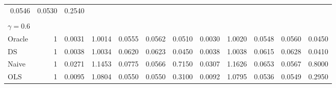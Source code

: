 \begin{tabular}{llllllllllll}
  \multicolumn{1}{r}{0.0546} &
  \multicolumn{1}{r}{0.0530} &
  \multicolumn{1}{r}{0.2540} \\
\multicolumn{1}{l}{} &
  \multicolumn{1}{|r}{} &
  \multicolumn{1}{r}{} &
  \multicolumn{1}{r}{} &
  \multicolumn{1}{r}{} &
  \multicolumn{1}{r}{} &
  \multicolumn{1}{r}{} &
  \multicolumn{1}{r}{} &
  \multicolumn{1}{r}{} &
  \multicolumn{1}{r}{} &
  \multicolumn{1}{r}{} &
  \multicolumn{1}{r}{} \\
\multicolumn{1}{l}{$\gamma = 0.6$} &
  \multicolumn{1}{|r}{} &
  \multicolumn{1}{r}{} &
  \multicolumn{1}{r}{} &
  \multicolumn{1}{r}{} &
  \multicolumn{1}{r}{} &
  \multicolumn{1}{r}{} &
  \multicolumn{1}{r}{} &
  \multicolumn{1}{r}{} &
  \multicolumn{1}{r}{} &
  \multicolumn{1}{r}{} &
  \multicolumn{1}{r}{} \\
\multicolumn{1}{l}{\hspace{1em}Oracle} &
  \multicolumn{1}{|r}{1} &
  \multicolumn{1}{r}{0.0031} &
  \multicolumn{1}{r}{1.0014} &
  \multicolumn{1}{r}{0.0555} &
  \multicolumn{1}{r}{0.0562} &
  \multicolumn{1}{r}{0.0510} &
  \multicolumn{1}{r}{0.0030} &
  \multicolumn{1}{r}{1.0020} &
  \multicolumn{1}{r}{0.0548} &
  \multicolumn{1}{r}{0.0560} &
  \multicolumn{1}{r}{0.0450} \\
\multicolumn{1}{l}{\hspace{1em}DS} &
  \multicolumn{1}{|r}{1} &
  \multicolumn{1}{r}{0.0038} &
  \multicolumn{1}{r}{1.0034} &
  \multicolumn{1}{r}{0.0620} &
  \multicolumn{1}{r}{0.0623} &
  \multicolumn{1}{r}{0.0450} &
  \multicolumn{1}{r}{0.0038} &
  \multicolumn{1}{r}{1.0038} &
  \multicolumn{1}{r}{0.0615} &
  \multicolumn{1}{r}{0.0628} &
  \multicolumn{1}{r}{0.0410} \\
\multicolumn{1}{l}{\hspace{1em}Naive} &
  \multicolumn{1}{|r}{1} &
  \multicolumn{1}{r}{0.0271} &
  \multicolumn{1}{r}{1.1453} &
  \multicolumn{1}{r}{0.0775} &
  \multicolumn{1}{r}{0.0566} &
  \multicolumn{1}{r}{0.7150} &
  \multicolumn{1}{r}{0.0307} &
  \multicolumn{1}{r}{1.1626} &
  \multicolumn{1}{r}{0.0653} &
  \multicolumn{1}{r}{0.0567} &
  \multicolumn{1}{r}{0.8000} \\
\multicolumn{1}{l}{\hspace{1em}OLS} &
  \multicolumn{1}{|r}{1} &
  \multicolumn{1}{r}{0.0095} &
  \multicolumn{1}{r}{1.0804} &
  \multicolumn{1}{r}{0.0550} &
  \multicolumn{1}{r}{0.0550} &
  \multicolumn{1}{r}{0.3100} &
  \multicolumn{1}{r}{0.0092} &
  \multicolumn{1}{r}{1.0795} &
  \multicolumn{1}{r}{0.0536} &
  \multicolumn{1}{r}{0.0549} &
  \multicolumn{1}{r}{0.2950} \\

\end{tabular}
